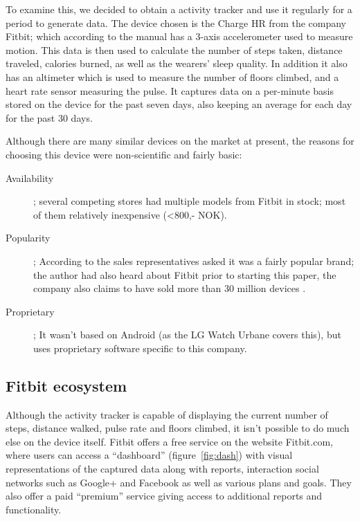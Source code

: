 \documentclass[a4paper,11pt,dvips]{article}
\begin{document}
To examine this, we decided to obtain a activity tracker and use it regularly for a period to generate data. The device chosen is the Charge HR from the company Fitbit; which according to the manual has a 3-axis accelerometer used to measure motion. This data is then used to calculate the number of steps taken, distance traveled, calories burned, as well as the wearers' sleep quality. In addition it also has an altimeter which is used to measure the number of floors climbed, and a heart rate sensor measuring the pulse. It captures data on a per-minute basis stored on the device for the past seven days, also keeping an average for each day for the past 30 days.

Although there are many similar devices on the market at present, the reasons for choosing this device were non-scientific and fairly basic:

\begin{description}
\item[Availability]; several competing stores had multiple models from Fitbit in stock; most of them relatively inexpensive (<800,- NOK).
\item[Popularity]; According to the sales representatives asked it was a fairly popular brand; the author had also heard about Fitbit prior to starting this paper, the company also claims to have sold more than 30 million devices \citep{Fitbit:2015}.
\item[Proprietary]; It wasn't based on Android (as the LG Watch Urbane covers this), but uses proprietary software specific to this company.
\end{description}

\subsection{Fitbit ecosystem}
Although the activity tracker is capable of displaying the current number of steps, distance walked, pulse rate and floors climbed, it isn't possible to do much else on the device itself. Fitbit offers a free service on the website Fitbit.com, where users can access a “dashboard” (figure~\ref{fig:dash}) with visual representations of the captured data along with reports, interaction social networks such as Google+ and Facebook as well as various plans and goals. They also offer a paid “premium” service giving access to additional reports and functionality.
\end{document}
